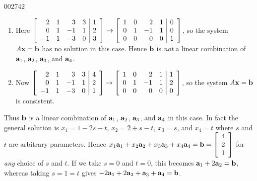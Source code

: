 \begin{example}{}{002742}
\begin{solution}
\begin{enumerate}[label={\alph*.}]
\item Here 
$
\left[ \begin{array}{rrrr|r}
2 & 1 & 3 & 3 & 1 \\
0 & 1 & -1 & 1 & 2 \\
-1 & 1 & -3 & 0 & 3
\end{array} \right]
\rightarrow
\left[ \begin{array}{rrrr|r}
1 & 0 & 2 & 1 & 0 \\
0 & 1 & -1 & 1 & 0 \\
0 & 0 & 0 & 0 & 1
\end{array} \right]$, so the system $A\textbf{x} = \textbf{b}$ has no solution in this case. Hence $\textbf{b}$ is \textit{not} a linear combination of $\textbf{a}_{1}$, $\textbf{a}_{2}$, $\textbf{a}_{3}$, and $\textbf{a}_{4}$.

\item Now
$
\left[ \begin{array}{rrrr|r}
2 & 1 & 3 & 3 & 4 \\
0 & 1 & -1 & 1 & 2 \\
-1 & 1 & -3 & 0 & 1
\end{array} \right]
\rightarrow
\left[ \begin{array}{rrrr|r}
1 & 0 & 2 & 1 & 1 \\
0 & 1 & -1 & 1 & 2 \\
0 & 0 & 0 & 0 & 0
\end{array} \right]$, so the system $A\textbf{x} = \textbf{b}$ is consistent.

\end{enumerate}

Thus $\textbf{b}$ is a linear combination of $\textbf{a}_{1}$, $\textbf{a}_{2}$, $\textbf{a}_{3}$, and $\textbf{a}_{4}$ in this case. In fact the general solution is $x_{1} = 1 - 2s - t$, $x_{2} = 2 + s - t$, $x_{3} = s$, and $x_{4} = t$ where $s$ and $t$ are arbitrary parameters. Hence $x_{1}\textbf{a}_{1} + x_{2}\textbf{a}_{2} + x_{3}\textbf{a}_{3} + x_{4}\textbf{a}_{4} = \textbf{b} = \left[ \begin{array}{r}
4 \\
2 \\
1
\end{array} \right]$
 for \textit{any} choice of $s$ and $t$. If we take $s = 0$ and $t = 0$, this becomes $\textbf{a}_{1} + 2\textbf{a}_{2} = \textbf{b}$, whereas taking $s = 1 = t$ gives $-2\textbf{a}_{1} + 2\textbf{a}_{2} + \textbf{a}_{3} + \textbf{a}_{4} = \textbf{b}$.
\end{solution}
\end{example}

